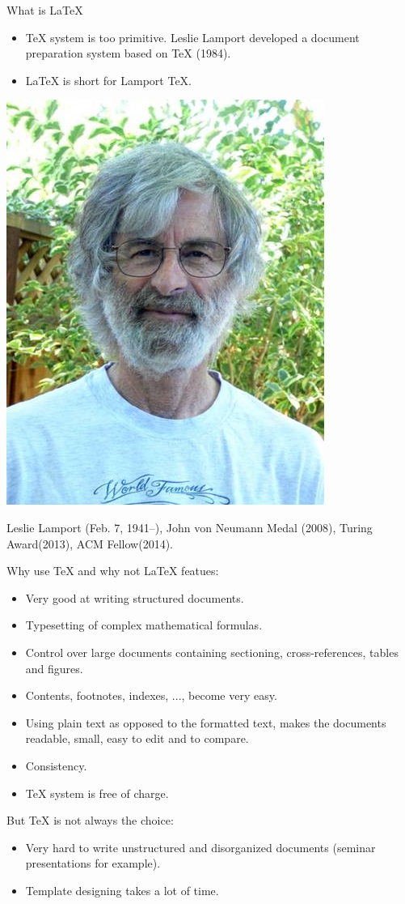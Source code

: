\documentclass[10pt]{beamer}
\begin{document}
\begin{frame}{What is \LaTeX}
\begin{itemize}
    \item \TeX{} system is too primitive. Leslie Lamport developed a document
    preparation system based on \TeX{} (1984).

    \item \LaTeX{} is short for Lamport TeX{}.
\end{itemize}
\begin{center}
    \includegraphics[width=.4\textwidth]{Leslie-Lamport.jpg}
\end{center}
    Leslie Lamport (Feb. 7, 1941--),
    John von Neumann Medal (2008),
    Turing Award(2013), ACM Fellow(2014).
\end{frame}

\begin{frame}{Why use \TeX{} and why not}
\LaTeX{} featues:
\begin{itemize}
    \item Very good at writing structured documents.
    \item Typesetting of complex mathematical formulas.
    \item Control over large documents containing sectioning,
        cross-references, tables and figures.
    \item Contents, footnotes, indexes, ..., become very easy.
    \item Using plain text as opposed to the formatted text, 
        makes the documents readable, small, easy to edit and to compare.
    \item Consistency.
    \item \TeX{} system is free of charge.
\end{itemize}

    But \TeX{} is not always the choice:
\begin{itemize}
    \item Very hard to write unstructured and disorganized documents
        (seminar presentations for example).
    \item Template designing takes a lot of time.
\end{itemize}
\end{frame}
\end{document}
